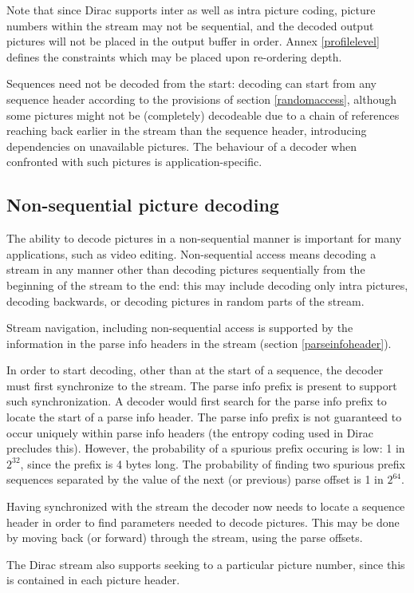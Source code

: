 Note that since Dirac supports inter as well as intra picture coding, picture numbers
within the stream may not be sequential, and the decoded output pictures will not be
placed in the output buffer in order. Annex \ref{profilelevel} defines the constraints
which may be placed upon re-ordering depth.

Sequences need not be decoded from the start: decoding can start from any sequence header
according to the provisions of section \ref{randomaccess}, although some pictures might
not be (completely) decodeable due to a chain of references reaching back earlier in the stream
than the sequence header, introducing dependencies on unavailable pictures. 
The behaviour of a decoder when confronted with such pictures is application-specific.

\subsection{Non-sequential picture decoding}
\label{nonsequential}
The ability to decode pictures in a non-sequential manner is important for many
 applications, such as video editing. Non-sequential access means decoding a 
stream in any manner other than decoding pictures sequentially from the beginning 
of the stream to the end: this may include decoding only intra pictures, decoding backwards, or decoding pictures in random parts of the stream. 

Stream navigation, including non-sequential access is supported by the information 
in the parse info headers in the stream (section \ref{parseinfoheader}). 

In order to start decoding, other than at the start of a sequence, the decoder 
must first synchronize to the stream. The parse info prefix is present to support such synchronization. A decoder would first search for the parse info prefix to locate 
the start of a parse info header. The parse info prefix is not guaranteed to occur
 uniquely within parse info headers (the entropy coding used in 
Dirac precludes this). However, the probability of a spurious 
prefix occuring is low: 1 in $2^{32}$, since the prefix is 4 bytes long. The probability of finding 
two spurious prefix sequences separated by the value of the next (or previous) parse 
offset is 1 in $2^{64}$.  

Having synchronized with the stream the decoder now needs to locate a sequence header 
in order to find parameters needed to decode pictures. This may be done by moving back (or forward) through the stream, using the parse offsets.

The Dirac stream also supports seeking to a particular picture number, since this
is contained in each picture header.

